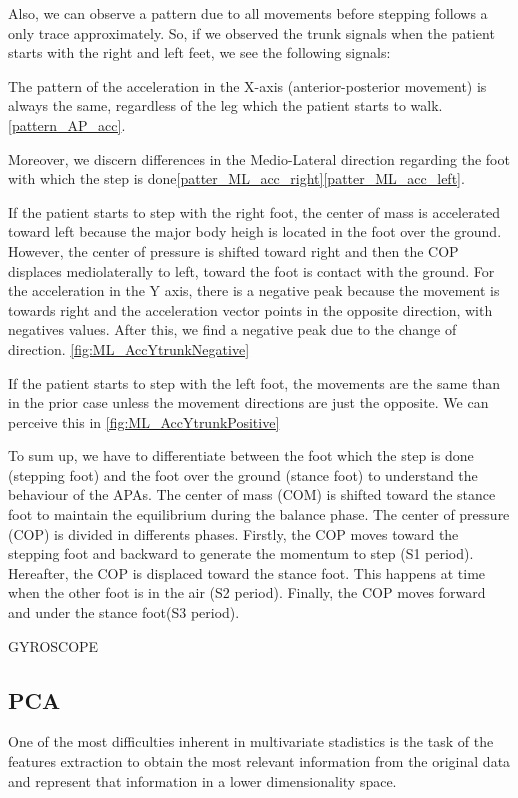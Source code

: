 Also, we can observe a pattern due to all movements before stepping follows a only trace approximately. So, if we observed the trunk signals when the patient starts with the right and left feet, we see the following signals:

The pattern of the acceleration in the X-axis (anterior-posterior movement) is always the same, regardless of the leg which the patient starts to walk. \ref{pattern_AP_acc}.

Moreover, we discern differences in the Medio-Lateral direction regarding the foot with which the step is done\ref{patter_ML_acc_right}\ref{patter_ML_acc_left}. 

If the patient starts to step with the right foot, the center of mass is accelerated toward left because the major body heigh is located in the foot over the ground. However, the center of pressure is shifted toward right and then the COP displaces mediolaterally to left, toward the foot is contact with the ground. For the acceleration in the Y axis, there is a negative peak because the movement is towards right and the acceleration vector points in the opposite direction, with negatives values. After this, we find a negative peak due to the change of direction. \ref{fig:ML_AccYtrunkNegative}

If the patient starts to step with the left foot, the movements are the same than in the prior case unless the movement directions are just the opposite. We can perceive this in \ref{fig:ML_AccYtrunkPositive}

To sum up, we have to differentiate between the foot which the step is done (stepping foot) and the foot over the ground (stance foot) to understand the behaviour of the APAs. The center of mass (COM) is shifted toward the stance foot to maintain the equilibrium during the balance phase. The center of pressure (COP) is divided in differents phases. Firstly, the COP moves toward the stepping foot and backward to generate the momentum to step (S1 period). Hereafter, the COP is displaced toward the stance foot. This happens at time when the other foot is in the air (S2 period). Finally, the COP moves forward and under the stance foot(S3 period). 
 
                 

GYROSCOPE

\subsection{PCA}
One of the most difficulties inherent in multivariate stadistics is the task of the features extraction to obtain the most relevant information from the original data and represent that information in a lower dimensionality space.

